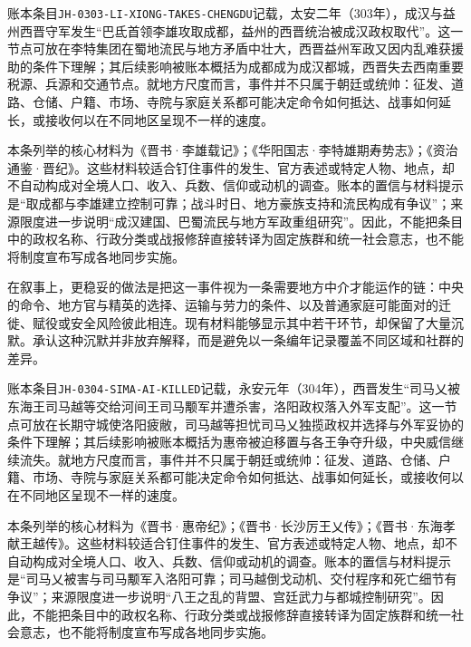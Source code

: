 账本条目\texttt{JH-0303-LI-XIONG-TAKES-CHENGDU}记载，太安二年（303年），成汉与益州西晋守军发生“巴氐首领李雄攻取成都，益州的西晋统治被成汉政权取代”。这一节点可放在李特集团在蜀地流民与地方矛盾中壮大，西晋益州军政又因内乱难获援助的条件下理解；其后续影响被账本概括为成都成为成汉都城，西晋失去西南重要税源、兵源和交通节点。就地方尺度而言，事件并不只属于朝廷或统帅：征发、道路、仓储、户籍、市场、寺院与家庭关系都可能决定命令如何抵达、战事如何延长，或接收何以在不同地区呈现不一样的速度。

本条列举的核心材料为《晋书·李雄载记》；《华阳国志·李特雄期寿势志》；《资治通鉴·晋纪》。这些材料较适合钉住事件的发生、官方表述或特定人物、地点，却不自动构成对全境人口、收入、兵数、信仰或动机的调查。账本的置信与材料提示是“取成都与李雄建立控制可靠；战斗时日、地方豪族支持和流民构成有争议”；来源限度进一步说明“成汉建国、巴蜀流民与地方军政重组研究”。因此，不能把条目中的政权名称、行政分类或战报修辞直接转译为固定族群和统一社会意志，也不能将制度宣布写成各地同步实施。

在叙事上，更稳妥的做法是把这一事件视为一条需要地方中介才能运作的链：中央的命令、地方官与精英的选择、运输与劳力的条件、以及普通家庭可能面对的迁徙、赋役或安全风险彼此相连。现有材料能够显示其中若干环节，却保留了大量沉默。承认这种沉默并非放弃解释，而是避免以一条编年记录覆盖不同区域和社群的差异。

账本条目\texttt{JH-0304-SIMA-AI-KILLED}记载，永安元年（304年），西晋发生“司马乂被东海王司马越等交给河间王司马颙军并遭杀害，洛阳政权落入外军支配”。这一节点可放在长期守城使洛阳疲敝，司马越等担忧司马乂独揽政权并选择与外军妥协的条件下理解；其后续影响被账本概括为惠帝被迫移置与各王争夺升级，中央威信继续流失。就地方尺度而言，事件并不只属于朝廷或统帅：征发、道路、仓储、户籍、市场、寺院与家庭关系都可能决定命令如何抵达、战事如何延长，或接收何以在不同地区呈现不一样的速度。

本条列举的核心材料为《晋书·惠帝纪》；《晋书·长沙厉王乂传》；《晋书·东海孝献王越传》。这些材料较适合钉住事件的发生、官方表述或特定人物、地点，却不自动构成对全境人口、收入、兵数、信仰或动机的调查。账本的置信与材料提示是“司马乂被害与司马颙军入洛阳可靠；司马越倒戈动机、交付程序和死亡细节有争议”；来源限度进一步说明“八王之乱的背盟、宫廷武力与都城控制研究”。因此，不能把条目中的政权名称、行政分类或战报修辞直接转译为固定族群和统一社会意志，也不能将制度宣布写成各地同步实施。

